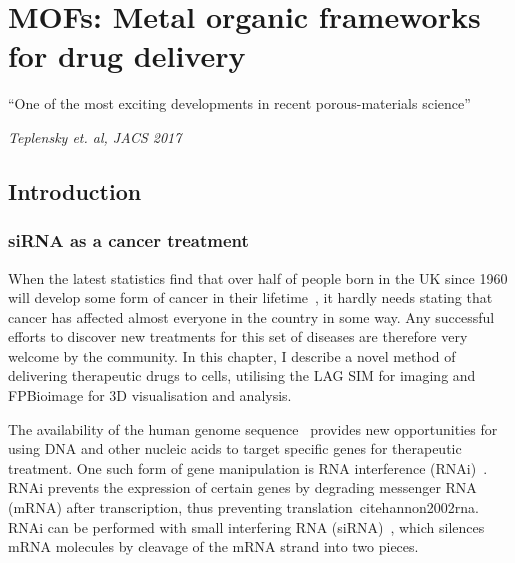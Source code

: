 \chapter{MOFs: Metal organic frameworks for drug delivery} \label{chap:MOF}


\ifpdf
    \graphicspath{{Chapter4/Figs/Raster/}{Chapter4/Figs/PDF/}{Chapter4/Figs/}}
\else
    \graphicspath{{Chapter4/Figs/Vector/}{Chapter4/Figs/}}
\fi

``One of the most exciting developments in recent porous-materials science''

\textit{Teplensky et. al, JACS 2017}~\cite{teplensky2017temperature}

\section{Introduction} \label{sec:MOF-intro}
\subsection{siRNA as a cancer treatment}
When the latest statistics find that over half of people born in the UK since 1960 will develop some form of cancer in their lifetime~\cite{ahmad2015trends}, it hardly needs stating that cancer has affected almost everyone in the country in some way. 
Any successful efforts to discover new treatments for this set of diseases are therefore very welcome by the community. 
In this chapter, I describe a novel method of delivering therapeutic drugs to cells, utilising the LAG SIM for imaging and FPBioimage for 3D visualisation and analysis. 

The availability of the human genome sequence~\cite{venter2001sequence, bentley2008accurate} provides new opportunities for using DNA and other nucleic acids to target specific genes for therapeutic treatment. 
One such form of gene manipulation is RNA interference (RNAi)~\cite{fire1998potent, timmons1998specific}. 
RNAi prevents the expression of certain genes by degrading messenger RNA (mRNA) after transcription, thus preventing translation~cite{hannon2002rna}. 
RNAi can be performed with small interfering RNA (siRNA)~\cite{hamilton1999species, elbashir2001duplexes}, which silences mRNA molecules by cleavage of the mRNA strand into two pieces. 

